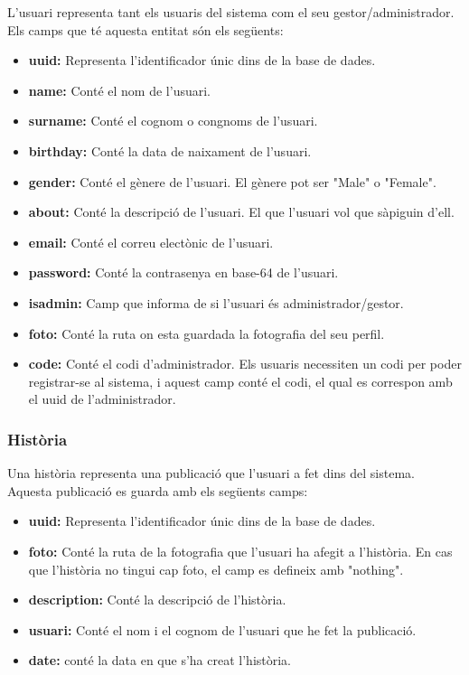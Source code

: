 \documentclass[11pt,catalan,listoffigures,listoftables]{tfgetsinf}
\begin{document}
L'usuari representa tant els usuaris del sistema com el seu gestor/administrador. Els camps que té aquesta entitat són els següents:
\begin{itemize}
	\item \textbf{uuid:} Representa l'identificador únic dins de la base de dades.
	\item \textbf{name:} Conté el nom de l'usuari.
	\item \textbf{surname:} Conté el cognom o congnoms de l'usuari.
	\item \textbf{birthday:} Conté la data de naixament de l'usuari.
	\item \textbf{gender:}  Conté el gènere de l'usuari. El gènere pot ser "Male" o "Female".
	\item \textbf{about:} Conté la descripció de l'usuari. El que l'usuari vol que sàpiguin d'ell.
	\item \textbf{email:} Conté el correu electònic de l'usuari.
	\item \textbf{password:} Conté la contrasenya en base-64 de l'usuari.
	\item \textbf{isadmin:} Camp que informa de si l'usuari és administrador/gestor.
	\item \textbf{foto:} Conté la ruta on esta guardada la fotografia del seu perfil.
	\item \textbf{code:} Conté el codi d'administrador. Els usuaris necessiten un codi per poder registrar-se al sistema, i aquest camp conté el codi, el qual es correspon amb el uuid de l'administrador.
\end{itemize}

\subsubsection{Història}

Una història representa una publicació que l'usuari a fet dins del sistema. Aquesta publicació es guarda amb els següents camps:
\begin{itemize}
	\item \textbf{uuid:} Representa l'identificador únic dins de la base de dades.
	\item \textbf{foto:} Conté la ruta de la fotografia que l'usuari ha afegit a l'història. En cas que l'història no tingui cap foto, el camp es defineix amb "nothing".
	\item \textbf{description:} Conté la descripció de l'història.
	\item \textbf{usuari:} Conté el nom i el cognom de l'usuari que he fet la publicació. 
	\item \textbf{date:} conté la data en que s'ha creat l'història.
\end{itemize}
\end{document}
